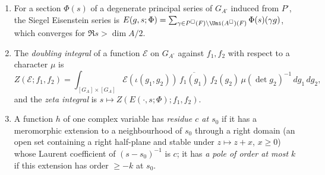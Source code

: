 \begin{definition}\label{pf:liftinj:eisdef}
\begin{enumerate}[label=(\alph*)]
\item For a section $\Phi(s)$ of a degenerate principal series of $G_{A^\square}$ induced from $P^\square$, the Siegel Eisenstein series is
$E(g,s;\Phi)=\sum_{\gamma\in P^\square(F)\backslash\Uni(A^\square)(F)}\Phi(s)(\gamma g)$, which converges for $\Re s>\dim A/2$.
\item The \emph{doubling integral} of a function $\mathcal E$ on $G_{A^\square}$ against $f_1,f_2$ with respect to a character $\mu$ is
\begin{equation}\label{eq:pf:liftinj:dbl}
Z(\mathcal E;f_1,f_2)=\int_{[G_A]\times[G_A]}\mathcal E(\iota(g_1,g_2))\,\overline{f_1(g_1)}\,f_2(g_2)\,
\mu(\det g_2)^{-1}\,dg_1\,dg_2 ,
\end{equation}
and the \emph{zeta integral} is $s\mapsto Z(E(\cdot,s;\Phi);f_1,f_2)$.
\item A function $h$ of one complex variable has \emph{residue $c$ at $s_0$} if it has a meromorphic extension to a neighbourhood of
$s_0$ through a right domain (an open set containing a right half-plane and stable under $z\mapsto z+x$, $x\ge0$) whose Laurent
coefficient of $(s-s_0)^{-1}$ is $c$; it has \emph{a pole of order at most $k$} if this extension has order $\ge-k$ at $s_0$.
\end{enumerate}
\end{definition}

